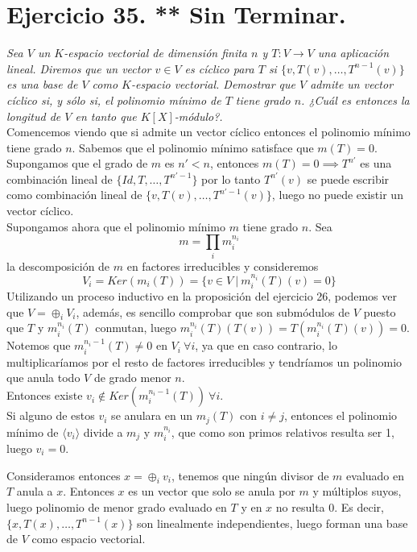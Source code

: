\section{Ejercicio 35. ** Sin Terminar.} \textit{Sea \(V\) un \(K\)-espacio
  vectorial de dimensión finita \(n\) y \(T:V \to V\) una
  aplicación lineal. Diremos que un vector \(v \in V\) es cíclico para
  \(T\) si \(\{v, T(v), \dots, T^{n-1}(v)\}\) es una base de \(V\)
  como \(K\)-espacio vectorial. Demostrar que \(V\) admite un vector cíclico si,
  y sólo si, el polinomio mínimo de \(T\) tiene grado \(n\). ¿Cuál es entonces
  la longitud de \(V\) en tanto que \(K[X]\)-módulo?.}\\


Comencemos viendo que si admite un vector cíclico entonces el polinomio mínimo
tiene grado \(n\). Sabemos que el polinomio mínimo satisface que \(m(T)=0\). Supongamos que el
grado de \(m\) es \(n' < n\),  entonces \(m(T)=0 \implies T^{n'}\) es una
combinación lineal de \(\{Id,T,\dots,T^{n'-1}\}\) por lo tanto \(T^{n'}(v)\) se
puede escribir como combinación lineal de \(\{v,T(v),\dots,T^{n'-1}(v)\}\),
luego no puede existir un vector cíclico.\\

Supongamos ahora que el polinomio mínimo \(m\) tiene grado \(n\). Sea
\[
  m = \prod_i m_i^{n_i}
\]
la descomposición de \(m\) en factores irreducibles y consideremos
\[
  V_i = Ker(m_i(T)) = \{v \in V \ | \ m_i^{n_i}(T)(v) = 0\}
\]
Utilizando un proceso inductivo en la proposición del ejercicio 26, podemos ver
que \(V = \oplus_i V_i\), además, es sencillo comprobar que son submódulos de \(V\) puesto que \(T\) y \(m_i^{n_i}(T)\)
conmutan, luego \(m_i^{n_i}(T)(T(v)) = T(m_i^{n_i}(T)(v)) = 0\).
Notemos que \(m_i^{n_i - 1}(T) \neq 0\) en \(V_i \ \forall i\), ya que en caso
contrario, lo multiplicaríamos por el resto de factores irreducibles y
tendríamos un polinomio que anula todo \(V\) de grado menor \(n\).\\

Entonces existe \(v_i \not \in Ker(m_i^{n_i-1}(T)) \ \forall i\).\\

Si alguno de estos \(v_i\) se anulara en un \(m_j(T)\) con \(i \neq j\),
entonces el polinomio mínimo de \(\langle v_i \rangle\) divide a \(m_j\) y
\(m_i^{n_i}\), que como son primos relativos resulta ser 1, luego \(v_i = 0\).

Consideramos entonces \(x = \oplus_i v_i\), tenemos que ningún divisor de \(m\)
evaluado en \(T\) anula a \(x\). Entonces \(x\) es un vector que solo se anula
por \(m\) y múltiplos suyos, luego polinomio de menor grado evaluado en \(T\) y
en \(x\) no resulta 0. Es decir, \(\{x, T(x), \dots, T^{n-1}(x)\}\)
son linealmente independientes, luego forman una base de \(V\) como espacio
vectorial.
